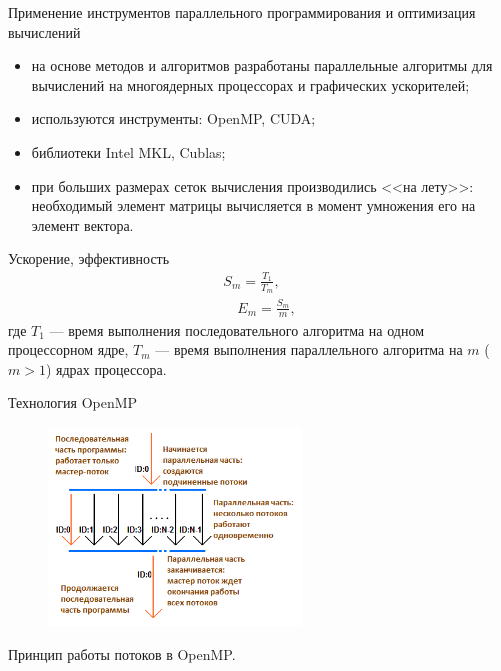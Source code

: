 \documentclass[10pt,pdf, mathserif, hyperref={unicode}]{beamer}
\begin{document}
\begin{frame}{Применение инструментов параллельного программирования и оптимизация вычислений}
	\begin{itemize}
		\item на основе методов и алгоритмов разработаны параллельные алгоритмы для вычислений на многоядерных процессорах и графических ускорителей;
		\item используются инструменты: OpenMP, CUDA;
		\item библиотеки Intel MKL, Cublas;
		\item при больших размерах сеток вычисления производились <<на лету>>: необходимый элемент матрицы вычисляется в момент умножения его на элемент вектора.
	\end{itemize}
\end{frame}
\begin{frame}{Ускорение, эффективность}
	\begin{equation}\nonumber
	\begin{aligned}
	S_m=\frac{T_1}{T_m},\\[16pt]
	\quad E_m=\frac{S_m}{m},
	\end{aligned}
	\end{equation}
	где 
	$T_1$ --- время выполнения последовательного алгоритма на одном
	процессорном ядре,
	$T_m$ --- время выполнения параллельного алгоритма на $m$ ($m>1$) ядрах процессора.
\end{frame}
\begin{frame}{Технология OpenMP}
	\begin{figure}[h]
		\centering
		\includegraphics[width=0.6\textwidth]{omp}
	\end{figure}
	\centering
	Принцип работы потоков в OpenMP.
\end{frame}
\end{document}
